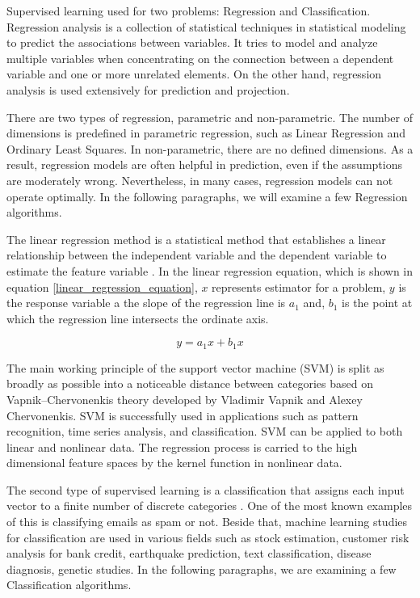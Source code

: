 Supervised learning used for two problems: Regression and Classification. Regression analysis is a collection of statistical techniques in statistical modeling to predict the associations between variables. It tries to model and analyze multiple variables when concentrating on the connection between a dependent variable and one or more unrelated elements. On the other hand, regression analysis is used extensively for prediction and projection.

There are two types of regression, parametric and non-parametric. The number of dimensions is predefined in parametric regression, such as Linear Regression and Ordinary Least Squares. In non-parametric, there are no defined dimensions. As a result, regression models are often helpful in prediction, even if the assumptions are moderately wrong. Nevertheless, in many cases, regression models can not operate optimally. In the following paragraphs, we will examine a few Regression algorithms.

The linear regression method is a statistical method that establishes a linear relationship between the independent variable and the dependent variable to estimate the feature variable \cite{tan2016introduction}. In the linear regression equation, which is shown in equation \ref{linear_regression_equation}, \(x\) represents estimator for a problem, \(y\) is the response variable a the slope of the regression line is \(a_1\) and, \(b_1\) is the point at which the regression line intersects the ordinate axis.

\begin{equation} \label{linear_regression_equation}
y = a_1x + b_1x
\end{equation}

The main working principle of the support vector machine (SVM) is split as broadly as possible into a noticeable distance between categories based on Vapnik–Chervonenkis theory developed by Vladimir Vapnik and Alexey Chervonenkis. SVM is successfully used in applications such as pattern recognition, time series analysis, and classification. SVM can be applied to both linear and nonlinear data. The regression process is carried to the high dimensional feature spaces by the kernel function in nonlinear data.

The second type of supervised learning is a classification that assigns each input vector to a finite number of discrete categories \cite{harrington2012machine}. One of the most known examples of this is classifying emails as spam or not. Beside that, machine learning studies for classification are used in various fields such as stock estimation, customer risk analysis for bank credit, earthquake prediction, text classification, disease diagnosis, genetic studies. In the following paragraphs, we are examining a few Classification algorithms.

